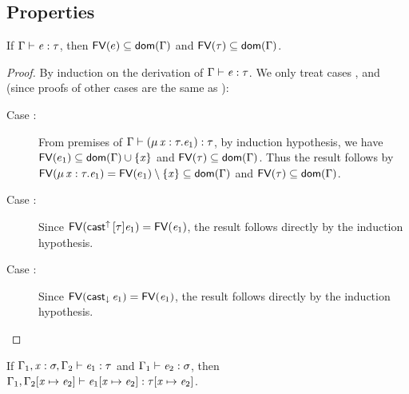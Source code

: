 \subsection{Properties}
\begin{lem}\label{lem:free}
    If $\Gamma  \vdash  \mathit{e}  :  \tau$, then $\mathsf{FV}(e) \subseteq \mathsf{dom}(\Gamma)$ and $\mathsf{FV}(\tau) \subseteq \mathsf{dom}(\Gamma)$.
\end{lem}

\begin{proof}
    By induction on the derivation of $\Gamma  \vdash  \mathit{e}  :  \tau$. We only treat cases ,  and  (since proofs of other cases are the same as \cc \cite{handbook}):
    \begin{description}
        \item[Case :] From premises of $\Gamma  \vdash  (  \mu \, \mathit{x}  :  \tau  .  \mathit{e_{{\mathrm{1}}}}  )  :  \tau$, by induction hypothesis, we have $\mathsf{FV}(e_1) \subseteq \mathsf{dom}(\Gamma) \cup \{\mathit{x}\}$ and $\mathsf{FV}(\tau) \subseteq \mathsf{dom}(\Gamma)$. Thus the result follows by $\mathsf{FV}(\mu \, \mathit{x}  :  \tau  .  \mathit{e_{{\mathrm{1}}}})=\mathsf{FV}(e_1) \setminus \{\mathit{x}\} \subseteq \mathsf{dom}(\Gamma)$ and $\mathsf{FV}(\tau) \subseteq \mathsf{dom}(\Gamma)$.
        \item[Case :] Since $\mathsf{FV}(\mathsf{cast}^{\uparrow} \, [  \tau  ]  \mathit{e_{{\mathrm{1}}}})=\mathsf{FV}(\mathit{e_{{\mathrm{1}}}})$, the result follows directly by the induction hypothesis.
        \item[Case :] Since $\mathsf{FV}(\mathsf{cast}_{\downarrow} \, \mathit{e_{{\mathrm{1}}}})=\mathsf{FV}(\mathit{e_{{\mathrm{1}}}})$, the result follows directly by the induction hypothesis.
    \end{description}
\end{proof}

\begin{lem}\label{lem:subst}
	If $\Gamma_{{\mathrm{1}}}  ,  \mathit{x}  :  \sigma  ,  \Gamma_{{\mathrm{2}}}  \vdash  \mathit{e_{{\mathrm{1}}}}  :  \tau$ and $\Gamma_{{\mathrm{1}}}  \vdash  \mathit{e_{{\mathrm{2}}}}  :  \sigma$, then $\Gamma_{{\mathrm{1}}}  ,  \Gamma_{{\mathrm{2}}}  [  \mathit{x}  \mapsto  \mathit{e_{{\mathrm{2}}}}  ]  \vdash  \mathit{e_{{\mathrm{1}}}}  [  \mathit{x}  \mapsto  \mathit{e_{{\mathrm{2}}}}  ]  :  \tau  [  \mathit{x}  \mapsto  \mathit{e_{{\mathrm{2}}}}  ]$.
\end{lem}

